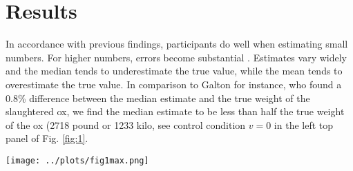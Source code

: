 \documentclass[9pt,twocolumn,twoside,lineno]{article}
\begin{document}
\section*{Results}
In accordance with previous findings, participants do well when estimating small numbers. For higher numbers, errors become substantial \cite{izard2008calibrating, kao2018counteracting, krueger1982single}. Estimates vary widely and the median tends to underestimate the true value, while the mean tends to overestimate the true value. In comparison to Galton for instance, who found a 0.8\% difference between the median estimate and the true weight of the slaughtered ox, we find the median estimate to be less than half the true weight of the ox (2718 pound or 1233 kilo, see control condition $v=0$ in the left top panel of Fig. \ref{fig:1}.

\begin{figure*}[!ht]
\centering
\texttt{[image: ../plots/fig1max.png]}
\caption{\textbf{Left:} Summary statistics of $d \times v$ treatments with a total of 10.348 magnitude estimates of either the number of dots in an image, $d \in \{55,148,403,1097\}$, or the weight of an ox, $d \in \{1233\}$, while being able to see $v \in \{0,1,3,9\}$ preceding estimates (light colors for low $d$ and dark colors for high $d$, greys show the controls). Estimates are log-transformed. Large circles indicate medians, triangles indicate arithmetic means, thick lines show interquartile ranges, thin lines show interdecile ranges, vertical black lines show the true value, and stars indicate significance levels compared to the control treatment with $v=0$ (Wilcoxon-Mann-Whitney test). No outliers were removed, making the arithmetic means strongly right skewed. \textbf{Right:} Summary statistics of $d \times v$ treatments with a total of 4.589 additional magnitude estimates, where participants do not see the preceding estimates but the $v \in \{1,3,9\}$ \textit{highest} estimates made so far. The controls, $v=0$, are the same as on the left hand side.}\label{fig:1}
\end{figure*}
\end{document}
